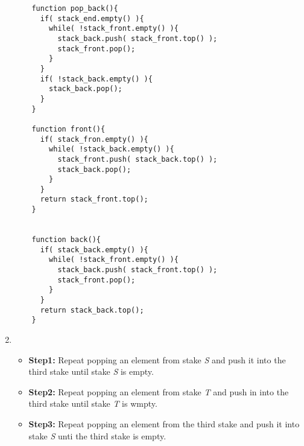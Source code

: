 \documentclass[fleqn,a4paper,12pt]{article}
\begin{document}
\begin{enumerate}
\begin{lstlisting}
    function pop_back(){
      if( stack_end.empty() ){
        while( !stack_front.empty() ){
          stack_back.push( stack_front.top() );
          stack_front.pop();
        }
      }
      if( !stack_back.empty() ){
        stack_back.pop();
      }
    }

    function front(){
      if( stack_fron.empty() ){
        while( !stack_back.empty() ){
          stack_front.push( stack_back.top() );
          stack_back.pop();
        }
      }
      return stack_front.top();
    }


    function back(){
      if( stack_back.empty() ){
        while( !stack_front.empty() ){
          stack_back.push( stack_front.top() );
          stack_front.pop();
        }
      }
      return stack_back.top();
    }

  \end{lstlisting}



\item
  \begin{itemize}
    \item
      \textbf{Step1: }Repeat popping an element from stake \textit{S} and push it into the third stake until stake \textit{S} is empty.
    \item
      \textbf{Step2: }Repeat popping an element from stake \textit{T} and push in into the third stake until stake \textit{T} is wmpty.
    \item
      \textbf{Step3: }Repeat popping an element from the third stake and push it into stake \textit{S} unti the third stake is empty.
    \end{itemize}
\end{enumerate}
\end{document}
